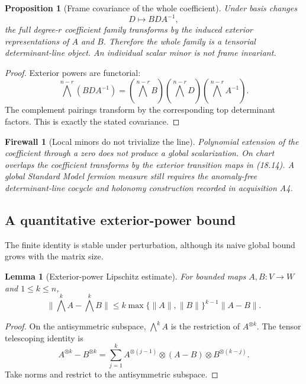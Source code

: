 \documentclass[11pt]{article}
\newtheorem{lemma}[theorem]{Lemma}
\newtheorem{proposition}[theorem]{Proposition}
\newtheorem{firewall}[theorem]{Firewall}
\begin{document}
\begin{proposition}[Frame covariance of the whole coefficient]
\label{prop:v11v18-frame}
Under basis changes
\[
 D\longmapsto BDA^{-1},
 \tag{18.14}
\]
the full degree-\(r\) coefficient family transforms by the induced
exterior representations of \(A\) and \(B\).  Therefore the whole family
is a tensorial determinant-line object.  An individual scalar minor is
not frame invariant.
\end{proposition}

\begin{proof}
Exterior powers are functorial:
\[
 \bigwedge^{n-r}(BDA^{-1})
 =
 (\bigwedge^{n-r}B)
 (\bigwedge^{n-r}D)
 (\bigwedge^{n-r}A^{-1}).
\]
The complement pairings transform by the corresponding top determinant
factors.  This is exactly the stated covariance.
\end{proof}

\begin{firewall}[Local minors do not trivialize the line]
\label{fw:v11v18-line}
Polynomial extension of the coefficient through a zero does not produce
a global scalarization.  On chart overlaps the coefficient transforms by
the exterior transition maps in (18.14).  A global Standard Model
fermion measure still requires the anomaly-free determinant-line cocycle
and holonomy construction recorded in acquisition A4.
\end{firewall}

\subsection{A quantitative exterior-power bound}

The finite identity is stable under perturbation, although its naive
global bound grows with the matrix size.

\begin{lemma}[Exterior-power Lipschitz estimate]
\label{lem:v11v18-exterior-lipschitz}
For bounded maps \(A,B:V\to W\) and \(1\leq k\leq n\),
\[
 \|\bigwedge^kA-\bigwedge^kB\|
 \leq
 k\max\{\|A\|,\|B\|\}^{k-1}\|A-B\|.
 \tag{18.15}
\]
\end{lemma}

\begin{proof}
On the antisymmetric subspace,
\(\bigwedge^kA\) is the restriction of \(A^{\otimes k}\).
The tensor telescoping identity is
\[
 A^{\otimes k}-B^{\otimes k}
 =
 \sum_{j=1}^k
 A^{\otimes(j-1)}\otimes(A-B)\otimes
 B^{\otimes(k-j)}.
\]
Take norms and restrict to the antisymmetric subspace.
\end{proof}
\end{document}
